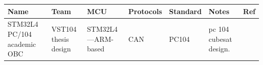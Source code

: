 \documentclass[10pt]{../datasheet}
\let\cite\citep
\begin{document}
\begin{landscape}
  \begin{longtable}{|p{2.6cm}|p{2.0cm}|p{3.8cm}|p{3.8cm}|p{1.4cm}|p{6.4cm}|p{1.0cm}|}
    \hline \textbf{Name}                                                                                                                                                                                                                                                              & \textbf{Team} & \textbf{MCU} & \textbf{Protocols} & \textbf{Standard} & \textbf{Notes} & \textbf{Ref} \\\hline \endhead
    \hline
    STM32L4 PC/104 academic OBC                                                                                                                                                                                                                                                       &
    VST104 thesis design                                                                                                                                                                                                                                                              &
    STM32L4—ARM-based                                                                                                                                                                                                                                                                 &
    CAN                                                                                                                                                                                                                                                                               &
    PC104                                                                                                                                                                                                                                                                             &
    pc 104 cubesat design.                                                                                                                                                                                                                                                            &
    \cite{stm32l4_vst104_pub}                                                                                                                                                                                                                                                                                                                                                                 \\ \hline

\end{longtable}
\end{landscape}
\end{document}
